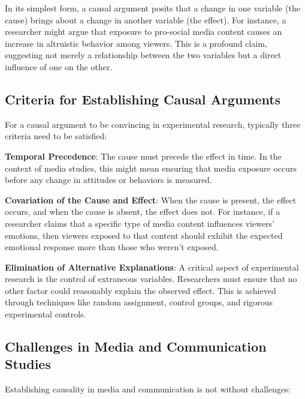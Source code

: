 \documentclass[
  b5paper]{book}
\begin{document}
In its simplest form, a causal argument posits that a change in one variable (the cause) brings about a change in another variable (the effect). For instance, a researcher might argue that exposure to pro-social media content causes an increase in altruistic behavior among viewers. This is a profound claim, suggesting not merely a relationship between the two variables but a direct influence of one on the other.

\hypertarget{criteria-for-establishing-causal-arguments}{%
\subsection*{Criteria for Establishing Causal Arguments}\label{criteria-for-establishing-causal-arguments}}

For a causal argument to be convincing in experimental research, typically three criteria need to be satisfied:

\textbf{Temporal Precedence}: The cause must precede the effect in time. In the context of media studies, this might mean ensuring that media exposure occurs before any change in attitudes or behaviors is measured.

\textbf{Covariation of the Cause and Effect}: When the cause is present, the effect occurs, and when the cause is absent, the effect does not. For instance, if a researcher claims that a specific type of media content influences viewers' emotions, then viewers exposed to that content should exhibit the expected emotional response more than those who weren't exposed.

\textbf{Elimination of Alternative Explanations}: A critical aspect of experimental research is the control of extraneous variables. Researchers must ensure that no other factor could reasonably explain the observed effect. This is achieved through techniques like random assignment, control groups, and rigorous experimental controls.

\hypertarget{challenges-in-media-and-communication-studies}{%
\subsection*{Challenges in Media and Communication Studies}\label{challenges-in-media-and-communication-studies}}

Establishing causality in media and communication is not without challenges:
\end{document}
